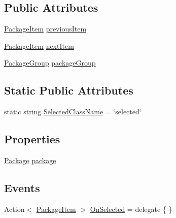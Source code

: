 \subsection*{Public Attributes}
\begin{DoxyCompactItemize}
\item 
\mbox{\hyperlink{class_unity_editor_1_1_package_manager_1_1_u_i_1_1_package_item}{Package\+Item}} \mbox{\hyperlink{class_unity_editor_1_1_package_manager_1_1_u_i_1_1_package_item_a195630cf7aa560a6bf6573fa6c86fbe0}{previous\+Item}}
\item 
\mbox{\hyperlink{class_unity_editor_1_1_package_manager_1_1_u_i_1_1_package_item}{Package\+Item}} \mbox{\hyperlink{class_unity_editor_1_1_package_manager_1_1_u_i_1_1_package_item_a7901cff10504efa742331aed2f87fcc1}{next\+Item}}
\item 
\mbox{\hyperlink{class_unity_editor_1_1_package_manager_1_1_u_i_1_1_package_group}{Package\+Group}} \mbox{\hyperlink{class_unity_editor_1_1_package_manager_1_1_u_i_1_1_package_item_a9705f50ae79bd941ff282c47a97bec2b}{package\+Group}}
\end{DoxyCompactItemize}
\subsection*{Static Public Attributes}
\begin{DoxyCompactItemize}
\item 
static string \mbox{\hyperlink{class_unity_editor_1_1_package_manager_1_1_u_i_1_1_package_item_a375a4d142d6f61dc5432082910189072}{Selected\+Class\+Name}} = \char`\"{}selected\char`\"{}
\end{DoxyCompactItemize}
\subsection*{Properties}
\begin{DoxyCompactItemize}
\item 
\mbox{\hyperlink{class_unity_editor_1_1_package_manager_1_1_u_i_1_1_package}{Package}} \mbox{\hyperlink{class_unity_editor_1_1_package_manager_1_1_u_i_1_1_package_item_ae1fd38fe3b548b78ce8dd5b24d73d784}{package}}
\end{DoxyCompactItemize}
\subsection*{Events}
\begin{DoxyCompactItemize}
\item 
Action$<$ \mbox{\hyperlink{class_unity_editor_1_1_package_manager_1_1_u_i_1_1_package_item}{Package\+Item}} $>$ \mbox{\hyperlink{class_unity_editor_1_1_package_manager_1_1_u_i_1_1_package_item_ada9c99405a7245f7d23fe5de001ac602}{On\+Selected}} = delegate \{ \}
\end{DoxyCompactItemize}


